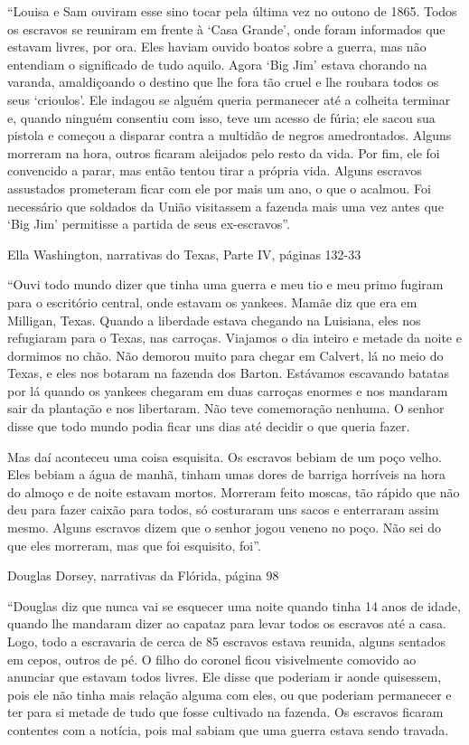 ``Louisa e Sam ouviram esse sino tocar pela última vez no outono de
1865. Todos os escravos se reuniram em frente à `Casa Grande', onde
foram informados que estavam livres, por ora. Eles haviam ouvido boatos
sobre a guerra, mas não entendiam o significado de tudo aquilo. Agora
`Big Jim' estava chorando na varanda, amaldiçoando o destino que lhe
fora tão cruel e lhe roubara todos os seus `crioulos'. Ele indagou se
alguém queria permanecer até a colheita terminar e, quando ninguém
consentiu com isso, teve um acesso de fúria; ele sacou sua pistola e
começou a disparar contra a multidão de negros amedrontados. Alguns
morreram na hora, outros ficaram aleijados pelo resto da vida. Por fim,
ele foi convencido a parar, mas então tentou tirar a própria vida.
Alguns escravos assustados prometeram ficar com ele por mais um ano, o
que o acalmou. Foi necessário que soldados da União visitassem a fazenda
mais uma vez antes que `Big Jim' permitisse a partida de seus
ex-escravos''.

Ella Washington, narrativas do Texas, Parte IV, páginas 132-33

``Ouvi todo mundo dizer que tinha uma guerra e meu tio e meu primo
fugiram para o escritório central, onde estavam os yankees. Mamãe diz
que era em Milligan, Texas. Quando a liberdade estava chegando na
Luisiana, eles nos refugiaram para o Texas, nas carroças. Viajamos o dia
inteiro e metade da noite e dormimos no chão. Não demorou muito para
chegar em Calvert, lá no meio do Texas, e eles nos botaram na fazenda
dos Barton. Estávamos escavando batatas por lá quando os yankees
chegaram em duas carroças enormes e nos mandaram sair da plantação e nos
libertaram. Não teve comemoração nenhuma. O senhor disse que todo mundo
podia ficar uns dias até decidir o que queria fazer.

Mas daí aconteceu uma coisa esquisita. Os escravos bebiam de um poço
velho. Eles bebiam a água de manhã, tinham umas dores de barriga
horríveis na hora do almoço e de noite estavam mortos. Morreram feito
moscas, tão rápido que não deu para fazer caixão para todos, só
costuraram uns sacos e enterraram assim mesmo. Alguns escravos dizem que
o senhor jogou veneno no poço. Não sei do que eles morreram, mas que foi
esquisito, foi''.

Douglas Dorsey, narrativas da Flórida, página 98

``Douglas diz que nunca vai se esquecer uma noite quando tinha 14 anos
de idade, quando lhe mandaram dizer ao capataz para levar todos os
escravos até a casa. Logo, todo a escravaria de cerca de 85 escravos
estava reunida, alguns sentados em cepos, outros de pé. O filho do
coronel ficou visivelmente comovido ao anunciar que estavam todos
livres. Ele disse que poderiam ir aonde quisessem, pois ele não tinha
mais relação alguma com eles, ou que poderiam permanecer e ter para si
metade de tudo que fosse cultivado na fazenda. Os escravos ficaram
contentes com a notícia, pois mal sabiam que uma guerra estava sendo
travada.

